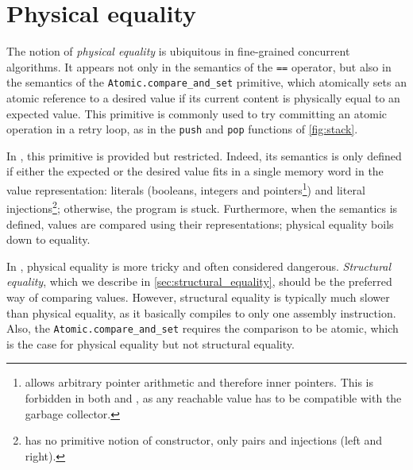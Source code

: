 \section{Physical equality}
\label{sec:physical_equality}



The notion of \emph{physical equality} is ubiquitous in fine-grained concurrent algorithms.
It appears not only in the semantics of the \texttt{==} operator, but also in the semantics of the \texttt{Atomic.compare_and_set} primitive, which atomically sets an atomic reference to a desired value if its current content is physically equal to an expected value.
This primitive is commonly used to try committing an atomic operation in a retry loop, as in the \texttt{push} and \texttt{pop} functions of \cref{fig:stack}.

In \HeapLang, this primitive is provided but restricted.
Indeed, its semantics is only defined if either the expected or the desired value fits in a single memory word in the \HeapLang value representation: literals (booleans, integers and pointers\footnote{\HeapLang allows arbitrary pointer arithmetic and therefore inner pointers. This is forbidden in both \OCaml and \ZooLang, as any reachable value has to be compatible with the garbage collector.}) and literal injections\footnote{\HeapLang has no primitive notion of constructor, only pairs and injections (left and right).}; otherwise, the program is stuck.
Furthermore, when the semantics is defined, values are compared using their \Rocq representations; physical equality boils down to \Rocq equality.

In \OCaml, physical equality is more tricky and often considered dangerous.
\emph{Structural equality}, which we describe in \cref{sec:structural_equality}, should be the preferred way of comparing values.
However, structural equality is typically much slower than physical equality, as it basically compiles to only one assembly instruction.
Also, the \texttt{Atomic.compare_and_set} requires the comparison to be atomic, which is the case for physical equality but not structural equality.


